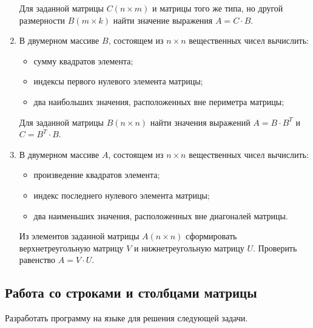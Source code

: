 \begin{enumerate}
Для заданной матрицы $C(n\times m)$ и матрицы того же типа, но другой размерности
$B(m\times k)$ найти значение выражения  $A=C\cdot B$.

\item В двумерном массиве $B$, состоящем из $n\times n$ вещественных чисел вычислить:

\begin{itemize}
\item сумму квадратов элемента;
\item индексы первого нулевого элемента матрицы;
\item два наибольших значения, расположенных вне периметра матрицы;
\end{itemize}

Для заданной матрицы $B(n\times n)$ найти значения выражений  $A=B\cdot B^T$ и 
$C=B^T\cdot B$.
\item В двумерном массиве $A$, состоящем из $n\times n$ вещественных чисел
вычислить:

\begin{itemize}
\item произведение квадратов элемента;
\item индекс последнего нулевого элемента матрицы;
\item два наименьших значения, расположенных вне диагоналей матрицы.
\end{itemize}

Из элементов заданной матрицы $A(n\times n)$ сформировать верхнетреугольную матрицу
$V$ и нижнетреугольную матрицу $U$. Проверить равенство  $A=V\cdot U$.
\end{enumerate}

\subsection[Работа со строками и столбцами матрицы]{Работа со строками и столбцами матрицы}
Разработать программу на языке  для решения следующей задачи.

